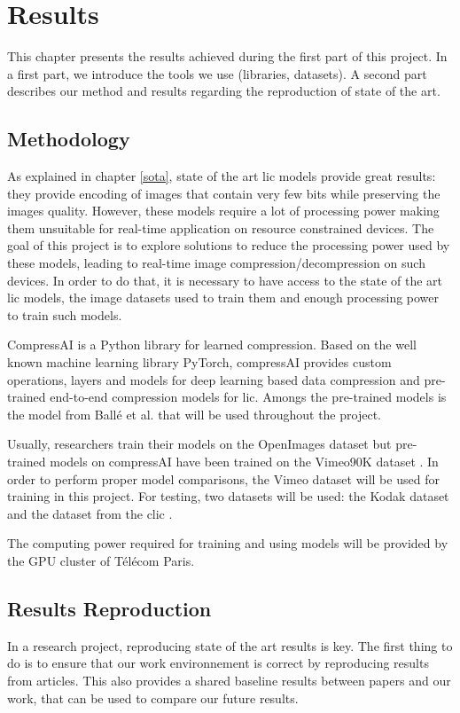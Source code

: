 \chapter{Results}
\label{results}
This chapter presents the results achieved during the first part of this project. In a first part, we introduce the tools we use (libraries, datasets). A second part describes our method and results regarding the reproduction of state of the art.

\section{Methodology}
As explained in chapter \ref{sota}, state of the art \acrshort{lic} models provide great results: they provide encoding of images that contain very few bits while preserving the images quality. However, these models require a lot of processing power making them unsuitable for real-time application on resource constrained devices. The goal of this project is to explore solutions to reduce the processing power used by these models, leading to real-time image compression/decompression on such devices. In order to do that, it is necessary to have access to the state of the art \acrshort{lic} models, the image datasets used to train them and enough processing power to train such models.

CompressAI \cite{compressai} is a Python library for learned compression. Based on the well known machine learning library PyTorch, compressAI provides custom operations, layers and models for deep learning based data compression and pre-trained end-to-end compression models for \acrshort{lic}. Amongs the pre-trained models is the model from Ballé et al.\cite{ballemshj18} that will be used throughout the project.

Usually, researchers train their models on the OpenImages dataset \cite{openimages} but pre-trained models on compressAI have been trained on the Vimeo90K dataset \cite{xue2019video}. In order to perform proper model comparisons, the Vimeo dataset will be used for training in this project. For testing, two datasets will be used: the Kodak dataset \cite{kodak} and the dataset from the \acrfull{clic} \cite{clic}.

The computing power required for training and using models will be provided by the GPU cluster of Télécom Paris.

\section{Results Reproduction}
In a research project, reproducing state of the art results is key. The first thing to do is to ensure that our work environnement is correct by reproducing results from articles. This also provides a shared baseline results between papers and our work, that can be used to compare our future results.

